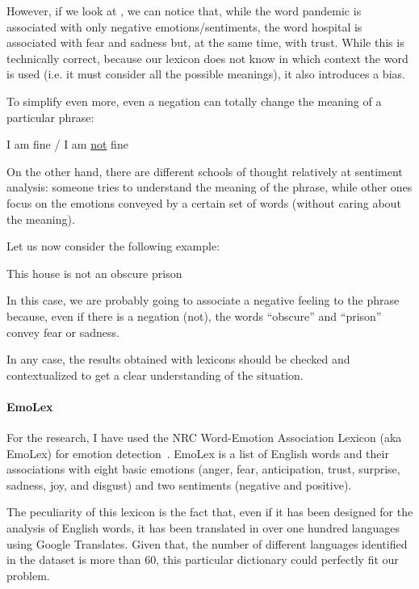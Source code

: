 However, if we look at , we can notice that, while the word pandemic is associated with only negative emotions/sentiments, the word hospital is associated with fear and sadness but, at the same time, with trust. While this is technically correct, because our lexicon does not know in which context the word is used (i.e. it must consider all the possible meanings), it also introduces a bias.

To simplify even more, even a negation can totally change the meaning of a particular phrase:

\begin{center}
	I am fine / I am \underline{not} fine
\end{center}

On the other hand, there are different schools of thought relatively at sentiment analysis: someone tries to understand the meaning of the phrase, while other ones focus on the emotions conveyed by a certain set of words (without caring about the meaning).

Let us now consider the following example: 

\begin{center}
	This house is not an obscure prison
\end{center}

In this case, we are probably going to associate a negative feeling to the phrase because, even if there is a negation (not), the words “obscure” and “prison” convey fear or sadness. 

In any case, the results obtained with lexicons should be checked and contextualized to get a clear understanding of the situation. 

\paragraph{EmoLex}

For the research, I have used the NRC Word-Emotion Association Lexicon (aka EmoLex) for emotion detection~\cite{ncrwebsite}. EmoLex is a list of English words and their associations with eight basic emotions (anger, fear, anticipation, trust, surprise, sadness, joy, and disgust) and two sentiments (negative and positive).

The peculiarity of this lexicon is the fact that, even if it has been designed for the analysis of English words, it has been translated in over one hundred languages using Google Translates. Given that, the number of different languages identified in the dataset is more than 60, this particular dictionary could perfectly fit our problem.

